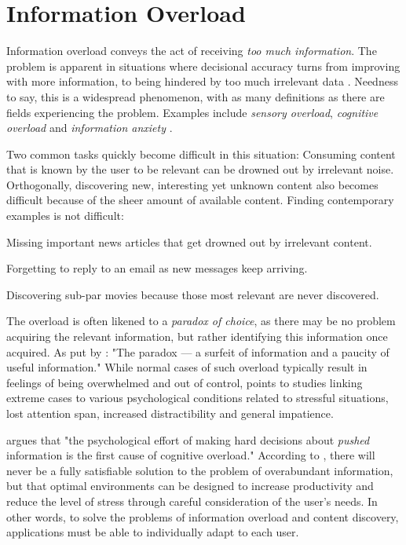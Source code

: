 \section{Information Overload}

Information overload conveys the act of receiving \emph{too much information}. 
The problem is apparent in situations where decisional accuracy turns from improving with more information, to being hindered by too much irrelevant data \cite[p13]{Bjorkoy2010d}. 
Needness to say, this is a widespread phenomenon, with as many definitions as there are fields experiencing the problem. Examples include \emph{sensory overload}, \emph{cognitive overload} and \emph{information anxiety} \citep{Eppler2004}.

Two common tasks quickly become difficult in this situation:
Consuming content that is known by the user to be relevant can be drowned out by irrelevant noise.
Orthogonally, discovering new, interesting yet unknown content also becomes difficult because of the sheer amount of available content.
Finding contemporary examples is not difficult:

\begin{itemize*}
  \item Missing important news articles that get drowned out by irrelevant content.
  \item Forgetting to reply to an email as new messages keep arriving.
  \item Discovering sub-par movies because those most relevant are never discovered.
\end{itemize*}

The overload is often likened to a \emph{paradox of choice}, as there may be no problem acquiring the relevant information, but rather identifying this information once acquired. As put by \cite{Edmunds2000}: "The paradox --- a surfeit of information and a paucity of useful information."
While normal cases of such overload typically result in feelings of being overwhelmed and out of control, \cite{Bawden2008} points to studies linking extreme cases to various psychological conditions related to stressful situations, lost attention span, increased distractibility and general impatience.

\cite{Kirsh2000} argues that "the psychological effort of making hard decisions about \emph{pushed} information is the first cause of cognitive overload." 
According to \citeauthor{Kirsh2000}, there will never be a fully satisfiable solution to the problem of overabundant information, 
but that optimal environments can be designed to increase productivity and reduce the level of stress through careful consideration of the user's needs. 
In other words, to solve the problems of information overload and content discovery, applications must be able to individually adapt to each user. 

